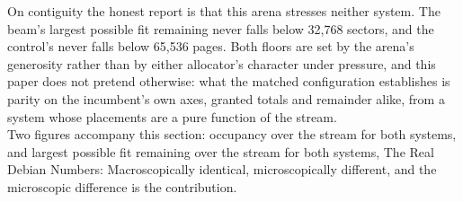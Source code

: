\documentclass{article}
\begin{document}
On contiguity the honest report is that this arena stresses neither system. The beam's largest possible fit remaining never falls below 32,768 sectors, and the control's never falls below 65,536 pages. Both floors are set by the arena's generosity rather than by either allocator's character under pressure, and this paper does not pretend otherwise: what the matched configuration establishes is parity on the incumbent's own axes, granted totals and remainder alike, from a system whose placements are a pure function of the stream.\\

Two figures accompany this section: occupancy over the stream for both systems, and largest possible fit remaining over the stream for both systems, The Real Debian Numbers:  Macroscopically identical, microscopically different, and the microscopic difference is the contribution.\\ 
\end{document}

